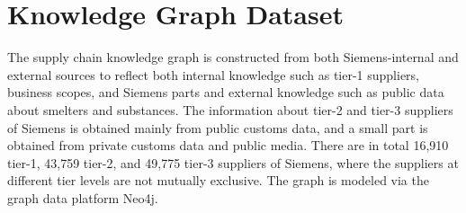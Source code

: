 \documentclass[
]{ceurart}
\begin{document}
\section{Knowledge Graph Dataset}
\label{sec:dataset}
The supply chain knowledge graph is constructed from both Siemens-internal and external sources to reflect both internal knowledge such as tier-1 suppliers, business scopes, and Siemens parts and external knowledge such as public data about smelters and substances. The information about tier-2 and tier-3 suppliers of Siemens is obtained mainly from public customs data, and a small part is obtained from private customs data and public media. There are in total 16,910 tier-1, 43,759 tier-2, and 49,775 tier-3 suppliers of Siemens, where the suppliers at different tier levels are not mutually exclusive. The graph is modeled via the graph data platform Neo4j.
 \begin{table}[b]
\caption{Entity and relation type statistics. In the graph, there are 8 entity types, where most nodes are suppliers, and 11 relation types, where most edges are from the type \textit{supplies\textunderscore to}.}
\begin{center}
\addtolength{\tabcolsep}{2pt}
\label{tab:entity_relation_type}
\end{center}
\end{table}
\end{document}
